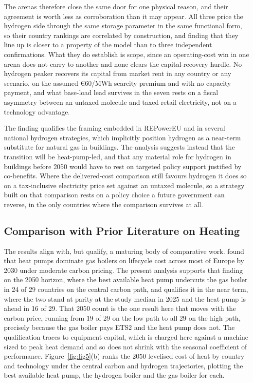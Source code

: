 The arenas therefore close the same door for one physical reason, and their agreement
is worth less as corroboration than it may appear. All three price the hydrogen side
through the same storage parameter in the same functional form, so their country
rankings are correlated by construction, and finding that they line up is closer to a
property of the model than to three independent confirmations. What they do establish
is scope, since an operating-cost win in one arena does not carry to another and none
clears the capital-recovery hurdle. No hydrogen peaker recovers its capital from market
rent in any country or any scenario, on the assumed \euro{}60/MWh scarcity premium and
with no capacity payment, and what base-load lead survives in the seven rests on a
fiscal asymmetry between an untaxed molecule and taxed retail electricity, not on a
technology advantage.

The finding qualifies the framing embedded in REPowerEU \citep{REpowerEU2022} and in
several national hydrogen strategies, which implicitly position hydrogen as a near-term
substitute for natural gas in buildings. The analysis suggests instead that the
transition will be heat-pump-led, and that any material role for hydrogen in buildings
before 2050 would have to rest on targeted policy support justified by co-benefits.
Where the delivered-cost comparison still favours hydrogen it does so on a
tax-inclusive electricity price set against an untaxed molecule, so a strategy built on
that comparison rests on a policy choice a future government can reverse, in the only
countries where the comparison survives at all.

\subsection{Comparison with Prior Literature on Heating}

The results align with, but qualify, a maturing body of comparative work.
\citet{Berger2020} found that heat pumps dominate gas boilers on lifecycle cost
across most of Europe by 2030 under moderate carbon pricing. The present analysis
supports that finding on the 2050 horizon, where the best available heat pump
undercuts the gas boiler in 24 of 29 countries on the central carbon path, and
qualifies it in the near term, where the two stand at parity at the study median
in 2025 and the heat pump is ahead in 16 of 29. That 2050 count is the one result
here that moves with the carbon price, running from 19 of 29 on the low path to
all 29 on the high path, precisely because the gas boiler pays ETS2 and the heat
pump does not. The qualification traces to equipment capital, which is
charged here against a machine sized to peak heat demand and so does not shrink
with the seasonal coefficient of performance. Figure~\ref{fig:fig5}(b) ranks the 2050 levelised cost
of heat by country and technology under the central carbon and hydrogen
trajectories, plotting the best available heat pump, the hydrogen boiler and the
gas boiler for each.

